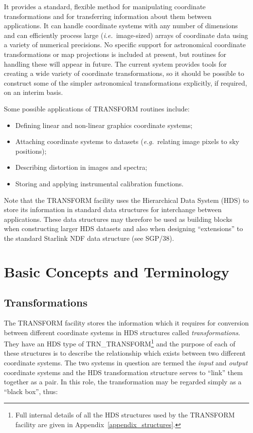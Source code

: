 \documentclass[twoside,11pt]{article}
\newcommand{\xref}[3]{#1}
\newcommand{\xlabel}[1]{}
\newcommand{\name}[1]{\mbox{\small{#1}}}
\begin{document}
It provides a standard, flexible method for manipulating coordinate
transformations and for transferring information about them between
applications. 
It can handle coordinate systems with any number of dimensions and can
efficiently process large (\emph{i.e.}\ image-sized) arrays of coordinate
data using a variety of numerical precisions. 
No specific support for astronomical coordinate transformations or map
projections is included at present, but routines for handling these will
appear in future.
The current system provides tools for creating a wide variety of coordinate
transformations, so it should be possible to construct some of the simpler
astronomical transformations explicitly, if required, on an interim basis. 

Some possible applications of \name{TRANSFORM} routines include:

\begin{itemize}
\item Defining linear and non-linear graphics coordinate systems;
\item Attaching coordinate systems to datasets (\emph{e.g.}\ relating image
pixels to sky positions); 
\item Describing distortion in images and spectra;
\item Storing and applying instrumental calibration functions.
\end{itemize}

Note that the \name{TRANSFORM} facility uses the Hierarchical Data System
\name{(HDS)} to store its information in standard data structures for
interchange between applications. 
These data structures may therefore be used as building blocks when
constructing larger \name{HDS} datasets and also when designing
``extensions'' to the standard Starlink \name{NDF} data structure (see
\xref{SGP/38}{sgp38}{}). 

\section{\xlabel{basic_concepts_and_terminology}Basic Concepts and Terminology}

\subsection{\xlabel{transformations}Transformations}

The \name{TRANSFORM} facility stores the information which it requires for
conversion between different coordinate systems in \name{HDS} structures
called {\em transformations}. 
They have an \name{HDS} type of \name{TRN\_TRANSFORM}\footnote{
Full internal details of all the \name{HDS} structures used by the
\name{TRANSFORM} facility are given in Appendix~\ref{appendix_structures}.} 
and the purpose of each of these structures is to describe the relationship
which exists between two different coordinate systems. 
The two systems in question are termed the \emph{input} and \emph{output}
coordinate systems and the \name{HDS} transformation structure serves to
``link'' them together as a pair. 
In this role, the transformation may be regarded simply as a ``black box'',
thus: 
\end{document}
